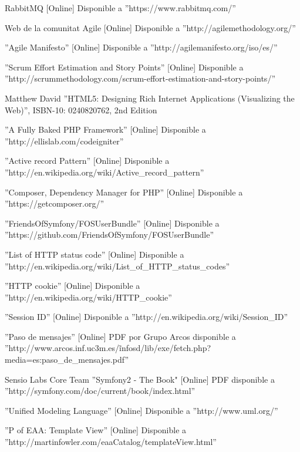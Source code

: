 \begin{thebibliography}{100}
 RabbitMQ [Online] Disponible a ''https://www.rabbitmq.com/''

 Web de la comunitat Agile [Online] Disponible a ''http://agilemethodology.org/''

 ''Agile Manifesto'' [Online] Disponible a ''http://agilemanifesto.org/iso/es/''

 ''Scrum Effort Estimation and Story Points'' [Online] Disponible a ''http://scrummethodology.com/scrum-effort-estimation-and-story-points/''

 Matthew David ''HTML5: Designing Rich Internet Applications (Visualizing the Web)'', ISBN-10: 0240820762, 2nd Edition

 ''A Fully Baked PHP Framework'' [Online] Disponible a ''http://ellislab.com/codeigniter''

 ''Active record Pattern'' [Online] Disponible a ''http://en.wikipedia.org/wiki/Active\_record\_pattern''

 ''Composer, Dependency Manager for PHP'' [Online] Disponible a ''https://getcomposer.org/''

 ''FriendsOfSymfony/FOSUserBundle'' [Online] Disponible a ''https://github.com/FriendsOfSymfony/FOSUserBundle''

 ''List of HTTP status code'' [Online] Disponible a ''http://en.wikipedia.org/wiki/List\_of\_HTTP\_status\_codes''

 ''HTTP cookie'' [Online] Disponible a ''http://en.wikipedia.org/wiki/HTTP\_cookie''

 ''Session ID'' [Online] Disponible a ''http://en.wikipedia.org/wiki/Session\_ID''

 ''Paso de mensajes'' [Online] PDF por Grupo Arcos disponible a  ''http://www.arcos.inf.uc3m.es/\~infosd/lib/exe/fetch.php?media=es:paso\_de\_mensajes.pdf''

 Sensio Labs Core Team ''Symfony2 - The Book" [Online] PDF disponible a  ''http://symfony.com/doc/current/book/index.html''

 ''Unified Modeling Language'' [Online] Disponible a ''http://www.uml.org/''

 ''P of EAA: Template View'' [Online] Disponible a ''http://martinfowler.com/eaaCatalog/templateView.html''


\end{thebibliography}
